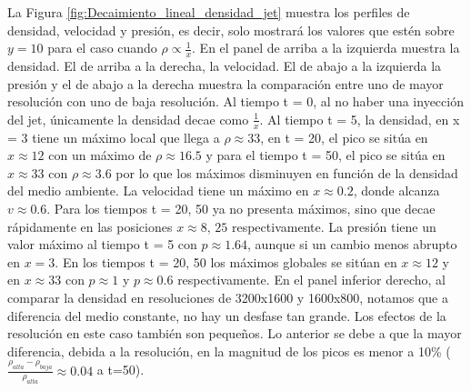 \documentclass[12pt,a4paper]{book}
\begin{document}
La Figura \ref{fig:Decaimiento_lineal_densidad_jet} muestra los perfiles de densidad, velocidad y presión, es decir, solo mostrará los valores que estén sobre $y = 10$ {para el caso cuando $\rho \varpropto \frac{1}{x}$}. En el panel de arriba 
a la izquierda  muestra la densidad. El de arriba a la derecha, la velocidad. El de abajo a la izquierda la presión y 
el de abajo a la derecha muestra la comparación entre
uno de mayor resolución con uno de baja resolución. Al tiempo t = 0, al no haber una inyección del jet, únicamente la densidad 
decae como $\frac{1}{x}$. Al tiempo t = 5, la densidad, en x = 3 tiene un máximo local que llega a 
$\rho  \approx 33$, en t = 20, el pico se sitúa en $x \approx 12$ con un máximo de 
$\rho  \approx 16.5$ y para el 
tiempo t = 50, el pico se sitúa en $x \approx 33$ con $\rho  \approx 3.6$ por lo que los máximos disminuyen en función de la 
densidad del medio ambiente.
La velocidad tiene un máximo en $x \approx 0.2$, donde alcanza  $v \approx 0.6$. Para los tiempos t = 20, 50 ya no 
presenta máximos, sino que decae rápidamente en las posiciones $x \approx 8, \, 25$ respectivamente.
La presión tiene un valor máximo al tiempo t = 5 con $p \approx 1.64$, aunque si un cambio menos abrupto en $x = 3$. 
En los tiempos t = 20, 50 los máximos globales se sitúan en $x \approx 12$ y en $x \approx 33$ 
con $p \approx  1$ y $p  \approx 0.6$ respectivamente.
En el panel inferior derecho, al comparar la densidad en resoluciones de 3200x1600 y 1600x800,
notamos que a diferencia del medio constante, no hay un desfase tan grande.  Los efectos de la resolución en este caso 
también son pequeños. Lo anterior se debe a que la mayor diferencia, debida a la resolución, 
en la magnitud de los picos es menor a 10\% ($\frac{\rho_{alta} - \rho_{baja}}{\rho_{alta}} \approx 0.04$ a t=50). 
\end{document}
